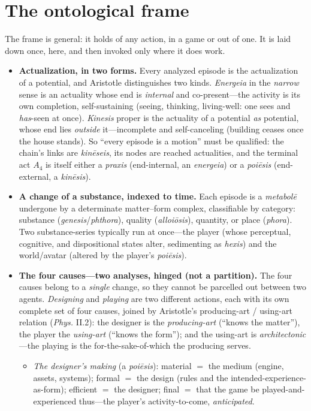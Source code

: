 \documentclass[11pt]{article}
\begin{document}
\section{The ontological frame}
\noindent The frame is general: it holds of any action, in a game or out of one. It is laid down once, here, and then invoked only where it does work.
\begin{itemize}
  \item \textbf{Actualization, in two forms.} Every analyzed episode is the actualization of a potential, and Aristotle distinguishes two kinds. \emph{Energeia} in the \emph{narrow} sense is an actuality whose end is \emph{internal} and co-present---the activity is its own completion, self-sustaining (seeing, thinking, living-well: one sees and \emph{has}-seen at once). \emph{Kinesis} proper is the actuality of a potential \emph{as} potential, whose end lies \emph{outside} it---incomplete and self-canceling (building ceases once the house stands). So ``every episode is a motion'' must be qualified: the chain's links are \textit{kin\=eseis}, its nodes are reached actualities, and the terminal act $A_4$ is itself either a \textit{praxis} (end-internal, an \textit{energeia}) or a \textit{poi\=esis} (end-external, a \textit{kin\=esis}).
  \item \textbf{A change of a substance, indexed to time.} Each episode is a \emph{metabol\=e} undergone by a determinate matter--form complex, classifiable by category: substance (\textit{genesis}/\textit{phthora}), quality (\textit{alloi\=osis}), quantity, or place (\textit{phora}). Two substance-series typically run at once---the player (whose perceptual, cognitive, and dispositional states alter, sedimenting as \textit{hexis}) and the world/avatar (altered by the player's \textit{poi\=esis}).
  \item \textbf{The four causes---two analyses, hinged (not a partition).} The four causes belong to a \emph{single} change, so they cannot be parcelled out between two agents. \emph{Designing} and \emph{playing} are two different actions, each with its own complete set of four causes, joined by Aristotle's producing-art / using-art relation (\emph{Phys.} II.2): the designer is the \emph{producing-art} (``knows the matter''), the player the \emph{using-art} (``knows the form''); and the using-art is \emph{architectonic}---the playing is the for-the-sake-of-which the producing serves.
    \begin{itemize}
      \item \emph{The designer's making} (a \textit{poi\=esis}): material $=$ the medium (engine, assets, systems); formal $=$ the design (rules and the intended-experience-as-form); efficient $=$ the designer; final $=$ that the game be played-and-experienced thus---the player's activity-to-come, \emph{anticipated}.

\end{itemize}
\end{itemize}
\end{document}
